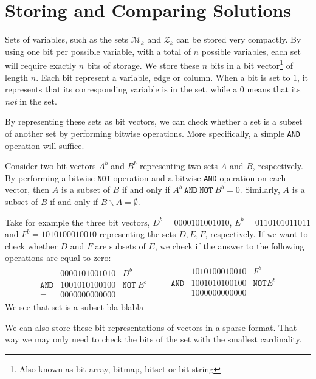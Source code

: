 \section{Storing and Comparing Solutions}
Sets of variables, such as the sets $\mathcal{M}_k$ and $\mathcal{Z}_k$ can be
stored very compactly.
By using one bit per possible variable, with a total of $n$ possible variables,
each set will require exactly $n$ bits of storage.
We store these $n$ bits in a bit vector\footnote{Also known as bit array,
bitmap, bitset or bit string} of length $n$.
Each bit represent a variable, edge or column.
When a bit is set to $1$, it represents that its corresponding variable is in
the set, while a $0$ means that its \emph{not} in the set.

By representing these sets as bit vectors, we can check whether a set is a
subset of another set by performing bitwise operations. More specifically,
a simple \texttt{AND} operation will suffice.

Consider two bit vectors $A^b$ and $B^b$ representing two sets $A$ and
$B$, respectively.
By performing a bitwise \texttt{NOT} operation and a bitwise \texttt{AND}
operation on each vector, then $A$ is a subset of $B$ if and only if
$A^b~\texttt{AND}~\texttt{NOT}~B^b = 0$.
Similarly, $A$ is a subset of $B$ if and only if $B \backslash A = \emptyset$.

Take for example the three bit vectors, $D^b = 0000101001010$,
$E^b = 0110101011011$ and $F^b = 1010100010010$ representing the sets
$D, E, F$, respectively. If we want to check whether $D$ and $F$ are subsets
of $E$, we check if the answer to the following operations are equal to zero:
\[
\begin{array}{lrl}
                 & 0000101001010 & D^b \\
    \texttt{AND} & 1001010100100 & \texttt{NOT}~E^b \\ \hline
    =            & 0000000000000
\end{array}
\qquad
\begin{array}{lrl}
                 & 1010100010010 & F^b \\
    \texttt{AND} & 1001010100100 & \texttt{NOT} E^b \\ \hline
    =            & 1000000000000 \\
\end{array}
\]
We see that set is a subset bla blabla

We can also store these bit representations of vectors in a sparse format.
That way we may only need to check the bits of the set with the smallest
cardinality.

